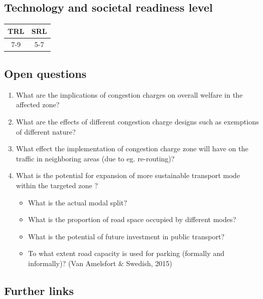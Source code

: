 \documentclass[
]{book}
\providecommand{\tightlist}{%
  \setlength{\itemsep}{0pt}\setlength{\parskip}{0pt}}
\begin{document}
\hypertarget{technology-and-societal-readiness-level-3}{%
\subsection*{Technology and societal readiness level}\label{technology-and-societal-readiness-level-3}}

\begin{longtable}[]{@{}cc@{}}
\toprule
TRL & SRL\tabularnewline
\midrule
\endhead
7-9 & 5-7\tabularnewline
\bottomrule
\end{longtable}

\hypertarget{open-questions-3}{%
\subsection*{Open questions}\label{open-questions-3}}

\begin{enumerate}
\def\labelenumi{\arabic{enumi}.}
\tightlist
\item
  What are the implications of congestion charges on overall welfare in the affected zone?
\item
  What are the effects of different congestion charge designs such as exemptions of different nature?
\item
  What effect the implementation of congestion charge zone will have on the traffic in neighboring areas (due to eg. re-routing)?
\item
  What is the potential for expansion of more sustainable transport mode within the targeted zone ?

  \begin{itemize}
  \tightlist
  \item
    What is the actual modal split?
  \item
    What is the proportion of road space occupied by different modes?
  \item
    What is the potential of future investment in public transport?
  \item
    To what extent road capacity is used for parking (formally and informally)? (Van Amelsfort \& Swedish, 2015)
  \end{itemize}
\end{enumerate}

\hypertarget{further-links-2}{%
\subsection*{Further links}\label{further-links-2}}
\end{document}
